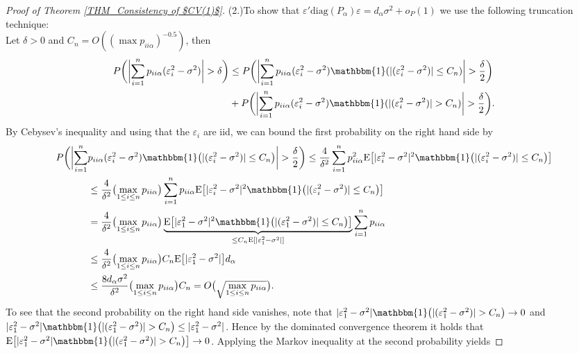 \documentclass[Research_Module_ES.tex]{subfiles}
\begin{document}
\begin{proof}[Proof of Theorem \ref{THM_Consistency of $CV(1)$}]
	(2.)To show that $\varepsilon'\mathrm{diag}(P_\alpha)\varepsilon=d_\alpha \sigma^2+o_P(1)$ we use the following truncation technique:\\
	Let $\delta>0$ and $C_n=O((\max p_{ii\alpha})^{-0.5})$, then 
	\begin{align*}
	P\biggl(\biggl|\sum_{i=1}^n p_{ii\alpha} (\varepsilon_i^2-\sigma^2)\biggr|>\delta\biggr)&\le
	P\biggl(\biggl|\sum_{i=1}^n p_{ii\alpha}(\varepsilon_i^2-\sigma^2)\mathbbm{1}(|(\varepsilon_i^2-\sigma^2)|\le C_n)\biggr|>\frac{\delta}{2}\biggr)\\
	&+  P\biggl(\biggl|\sum_{i=1}^n p_{ii\alpha}(\varepsilon_i^2-\sigma^2)\mathbbm{1}(|(\varepsilon_i^2-\sigma^2)|> C_n)\biggr|>\frac{\delta}{2}\biggr).
	\end{align*}
	By Cebysev's inequality and using that the $\varepsilon_i$ are iid, we can bound the first probability on the right hand side by
	\begin{align*}
	P\biggl(\biggl|\sum_{i=1}^n &p_{ii\alpha}(\varepsilon_i^2-\sigma^2)\mathbbm{1}\bigl(|(\varepsilon_i^2-\sigma^2)|\le C_n\bigr)\biggr|>\frac{\delta}{2}\biggr)\le \frac{4}{\delta^2}\sum_{i=1}^n p_{ii\alpha}^2\mathrm{E}\bigl[|\varepsilon_i^2-\sigma^2|^2\mathbbm{1}\bigl(|(\varepsilon_i^2-\sigma^2)|\le C_n\bigr)\bigr]\\
	&\le \frac{4}{\delta^2}\bigl(\max_{1\le i\le n}p_{ii\alpha}\bigr)\sum_{i=1}^n p_{ii\alpha}\mathrm{E}\bigl[|\varepsilon_i^2-\sigma^2|^2\mathbbm{1}\bigl(|(\varepsilon_i^2-\sigma^2)|\le C_n\bigr)\bigr]\\
	&= \frac{4}{\delta^2}\bigl(\max_{1\le i\le n}p_{ii\alpha}\bigr)\underbrace{\mathrm{E}\bigl[|\varepsilon_1^2-\sigma^2|^2\mathbbm{1}\bigl(|(\varepsilon_1^2-\sigma^2)|\le C_n\bigr)\bigr]}_{\le C_n\mathrm{E}[|\varepsilon_1^2-\sigma^2|]}\sum_{i=1}^n p_{ii\alpha}\\
	&\le \frac{4}{\delta^2}\bigl(\max_{1\le i\le n}p_{ii\alpha}\bigr)C_n\mathrm{E}\bigl[|\varepsilon_1^2-\sigma^2|\bigr]d_\alpha\\
	&\le \frac{8d_\alpha\sigma^2}{\delta^2}\bigl(\max_{1\le i\le n}p_{ii\alpha}\bigr)C_n = O\bigl(\sqrt{\max_{1\le i\le n}p_{ii\alpha}}\bigr).
	\end{align*}
	To see that the second probability on the right hand side vanishes, note that $|\varepsilon_1^2-\sigma^2|\mathbbm{1}\bigl(|(\varepsilon_1^2-\sigma^2)|> C_n\bigr)\to 0$ and $|\varepsilon_1^2-\sigma^2|\mathbbm{1}\bigl(|(\varepsilon_1^2-\sigma^2)|> C_n\bigr)\le |\varepsilon_1^2-\sigma^2|$. Hence by the dominated convergence theorem it holds that $\mathrm{E}\bigl[|\varepsilon_1^2-\sigma^2|\mathbbm{1}\bigl(|(\varepsilon_1^2-\sigma^2)|> C_n\bigr)\bigr] \to 0$. Applying the Markov inequality at the second probability yields

\end{proof}
\end{document}
